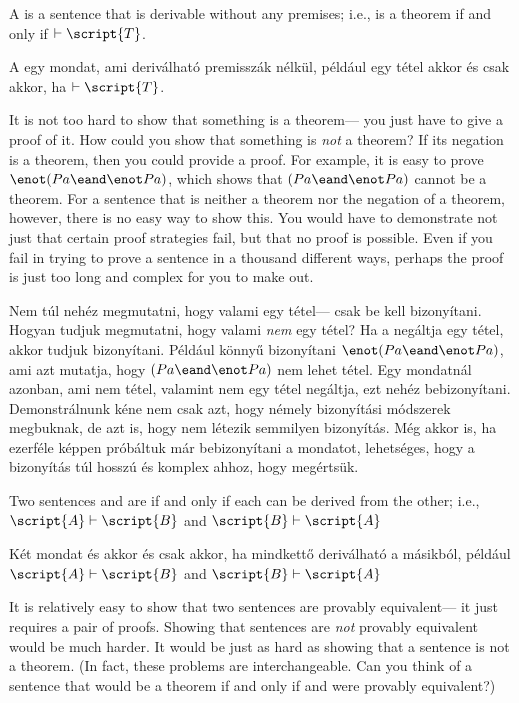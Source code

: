 A  is a sentence that is derivable without any premises; i.e.,  is a theorem if and only if $\vdash\script{T}$.

A  egy mondat, ami deriválható premisszák nélkül, például  egy tétel akkor és csak akkor, ha $\vdash\script{T}$.

It is not too hard to show that something is a theorem--- you just have to give a proof of it. How could you show that something is \emph{not} a theorem? If its negation is a theorem, then you could provide a proof. For example, it is easy to prove $\enot(Pa \eand \enot Pa)$, which shows that $(Pa \eand \enot Pa)$ cannot be a theorem. For a sentence that is neither a theorem nor the negation of a theorem, however, there is no easy way to show this. You would have to demonstrate not just that certain proof strategies fail, but that no proof is possible. Even if you fail in trying to prove a sentence in a thousand different ways, perhaps the proof is just too long and complex for you to make out.

Nem túl nehéz megmutatni, hogy valami egy tétel--- csak be kell bizonyítani. Hogyan tudjuk megmutatni, hogy valami \emph{nem} egy tétel? Ha a negáltja egy tétel, akkor tudjuk bizonyítani. Például könnyű bizonyítani $\enot(Pa \eand \enot Pa)$, ami azt mutatja, hogy $(Pa \eand \enot Pa)$ nem lehet tétel. Egy mondatnál azonban, ami nem tétel, valamint nem egy tétel negáltja, ezt nehéz bebizonyítani. Demonstrálnunk kéne nem csak azt, hogy némely bizonyítási módszerek megbuknak, de azt is, hogy nem létezik semmilyen bizonyítás. Még akkor is, ha ezerféle képpen próbáltuk már bebizonyítani a mondatot, lehetséges, hogy a bizonyítás túl hosszú és komplex ahhoz, hogy megértsük.

Two sentences  and  are  if and only if each can be derived from the other; i.e., $\script{A}\vdash\script{B}$ and $\script{B}\vdash\script{A}$

Két mondat  és   akkor és csak akkor, ha mindkettő deriválható a másikból, például $\script{A}\vdash\script{B}$ and $\script{B}\vdash\script{A}$

It is relatively easy to show that two sentences are provably equivalent--- it just requires a pair of proofs. Showing that sentences are \emph{not} provably equivalent would be much harder. It would be just as hard as showing that a sentence is not a theorem. (In fact, these problems are interchangeable. Can you think of a sentence that would be a theorem if and only if  and  were provably equivalent?)

